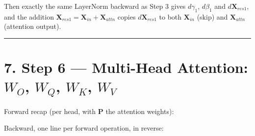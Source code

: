 \documentclass[11pt,a4paper,oneside]{report}
\begin{document}
Then exactly the same LayerNorm backward as Step 3 gives \(d\gamma_1\), \(d\beta_1\) and \(d\mathbf{X}_{res1}\), and the addition \(\mathbf{X}_{res1} = \mathbf{X}_{in} + \mathbf{X}_{attn}\) copies \(d\mathbf{X}_{res1}\) to both \(\mathbf{X}_{in}\) (skip) and \(\mathbf{X}_{attn}\) (attention output).

\begin{center}\rule{0.5\linewidth}{0.5pt}\end{center}

\section{\texorpdfstring{7. Step 6 --- Multi-Head Attention: \(W_O\), \(W_Q\), \(W_K\), \(W_V\)}{7. Step 6 --- Multi-Head Attention: W\_O, W\_Q, W\_K, W\_V}}\label{7-step-6--multi-head-attention-w_o-w_q-w_k-w_v}

Forward recap (per head, with \(\mathbf{P}\) the attention weights):

\begin{center}\end{center}

Backward, one line per forward operation, in reverse:
\end{document}
